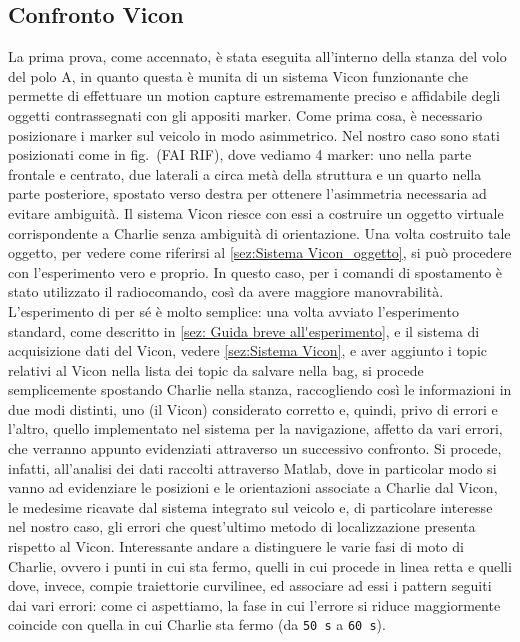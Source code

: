 \subsection{Confronto Vicon}
La prima prova, come accennato, è stata eseguita all'interno della stanza del volo del polo A, in quanto questa è munita di un sistema Vicon funzionante che permette di effettuare un motion capture estremamente preciso e affidabile degli oggetti contrassegnati con gli appositi marker. Come prima cosa, è necessario posizionare i marker sul veicolo in modo asimmetrico. Nel nostro caso sono stati posizionati come in fig.~(FAI RIF), dove vediamo 4 marker: uno nella parte frontale e centrato, due laterali a circa metà della struttura e un quarto nella parte posteriore, spostato verso destra per ottenere l'asimmetria necessaria ad evitare ambiguità. Il sistema Vicon riesce con essi a costruire un oggetto virtuale corrispondente a Charlie senza ambiguità di orientazione. Una volta costruito tale oggetto, per vedere come riferirsi al \ref{sez:Sistema Vicon_oggetto}, si può procedere con l'esperimento vero e proprio. In questo caso, per i comandi di spostamento è stato utilizzato il radiocomando, così da avere maggiore manovrabilità. L'esperimento di per sé è molto semplice: una volta avviato l'esperimento standard, come descritto in \ref{sez: Guida breve all'esperimento}, e il sistema di acquisizione dati del Vicon, vedere \ref{sez:Sistema Vicon}, e aver aggiunto i topic relativi al Vicon nella lista dei topic da salvare nella bag, si procede semplicemente spostando Charlie nella stanza, raccogliendo così le informazioni in due modi distinti, uno (il Vicon) considerato corretto e, quindi, privo di errori e l'altro, quello implementato nel sistema per la navigazione, affetto da vari errori, che verranno appunto evidenziati attraverso un successivo confronto.
Si procede, infatti, all'analisi dei dati raccolti attraverso Matlab, dove in particolar modo si vanno ad evidenziare le posizioni e le orientazioni associate a Charlie dal Vicon, le medesime ricavate dal sistema integrato sul veicolo e, di particolare interesse nel nostro caso, gli errori che quest'ultimo metodo di localizzazione presenta rispetto al Vicon. Interessante andare a distinguere le varie fasi di moto di Charlie, ovvero i punti in cui sta fermo, quelli in cui procede in linea retta e quelli dove, invece, compie traiettorie curvilinee, ed associare ad essi i pattern seguiti dai vari errori: come ci aspettiamo, la fase in cui l'errore si riduce maggiormente coincide con quella in cui Charlie sta fermo (da \verb|50 s| a \verb|60 s|).

